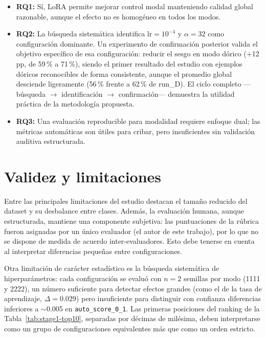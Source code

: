 \documentclass[%
    school=etsisi,%
    type=pfg,%
    degree=61CD,%
]{upm-report}
\begin{document}
\begin{itemize}
    \item \textbf{RQ1:} S\'i, LoRA permite mejorar control modal manteniendo calidad global razonable, aunque el efecto no es homog\'eneo en todos los modos.
    \item \textbf{RQ2:} La b\'usqueda sistem\'atica identifica $\text{lr} = 10^{-4}$ y $\alpha = 32$ como configuraci\'on dominante. Un experimento de confirmaci\'on posterior valida el objetivo espec\'ifico de esa configuraci\'on: reducir el sesgo en modo d\'orico (+12\,pp, de 59\,\% a 71\,\%), siendo el primer resultado del estudio con ejemplos d\'oricos reconocibles de forma consistente, aunque el promedio global desciende ligeramente (56\,\% frente a 62\,\% de run\_D). El ciclo completo ---b\'usqueda $\to$ identificaci\'on $\to$ confirmaci\'on--- demuestra la utilidad pr\'actica de la metodolog\'ia propuesta.
    \item \textbf{RQ3:} Una evaluaci\'on reproducible para modalidad requiere enfoque dual; las m\'etricas autom\'aticas son \'utiles para cribar, pero insuficientes sin validaci\'on auditiva estructurada.
\end{itemize}

\section{Validez y limitaciones}

Entre las principales limitaciones del estudio destacan el tama\~no reducido del dataset y su desbalance entre clases. Adem\'as, la evaluaci\'on humana, aunque estructurada, mantiene una componente subjetiva: las puntuaciones de la r\'ubrica fueron asignadas por un \'unico evaluador (el autor de este trabajo), por lo que no se dispone de medida de acuerdo inter-evaluadores. Esto debe tenerse en cuenta al interpretar diferencias peque\~nas entre configuraciones.

Otra limitaci\'on de car\'acter estad\'istico es la b\'usqueda sistem\'atica de hiperpar\'ametros: cada configuraci\'on se evalu\'o con $n=2$ semillas por modo (1111 y 2222), un n\'umero suficiente para detectar efectos grandes (como el de la tasa de aprendizaje, $\Delta=0.029$) pero insuficiente para distinguir con confianza diferencias inferiores a $\sim$0.005 en \texttt{auto\_score\_0\_1}. Las primeras posiciones del ranking de la Tabla~\ref{tab:stage1-top10}, separadas por d\'ecimas de mil\'esima, deben interpretarse como un grupo de configuraciones equivalentes m\'as que como un orden estricto.
\end{document}
